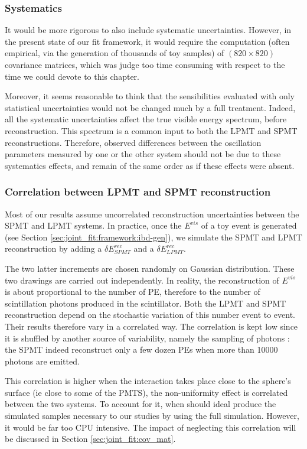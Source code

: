\documentclass[../main.tex]{subfiles}
\begin{document}
\subsubsection{Systematics}
It would be more rigorous to also include systematic uncertainties. However, in the present state of our fit framework, it would require the computation (often empirical, via the generation of thousands of toy samples) of $(820 \times 820)$ covariance matrices, which was judge too time consuming with respect to the time we could devote to this chapter.

Moreover, it seems reasonable to think that the sensibilities evaluated with only statistical uncertainties would not be changed much by a full treatment. Indeed, all the systematic uncertainties affect the true visible energy spectrum, before reconstruction. This spectrum is a common input to both the LPMT and SPMT reconstructions. Therefore, observed differences between the oscillation parameters measured by one or the other system should not be due to these systematics effects, and remain of the same order as if these effects were absent.

\subsubsection{Correlation between LPMT and SPMT reconstruction}

Most of our results assume uncorrelated reconstruction uncertainties between the SPMT and LPMT systems. In practice, once the $E^{vis}$ of a toy event is generated (see Section \ref{sec:joint_fit:framework:ibd-gen}), we simulate the SPMT and LPMT reconstruction by adding a $\delta E^{rec}_{SPMT}$ and a $\delta E^{rec}_{LPMT}$.

The two latter increments are chosen randomly on Gaussian distribution. These two drawings are carried out independently. In reality, the reconstruction of $E^{vis}$ is about proportional to the number of PE, therefore to the number of scintillation photons produced in the scintillator. Both the LPMT and SPMT reconstruction depend on the stochastic variation of this number event to event. Their results therefore vary in a correlated way. The correlation is kept low since it is shuffled by another source of variability, namely the sampling of photons : the SPMT indeed reconstruct only a few dozen PEs when more than 10000 photons are emitted.

This correlation is higher when the interaction takes place close to the sphere's surface (ie close to some of the PMTS), the non-uniformity effect is correlated between the two systems. To account for it, when should ideal produce the simulated samples necessary to our studies by using the full simulation. However, it would be far too CPU intensive. The impact of neglecting this correlation will be discussed in Section \ref{sec:joint_fit:cov_mat}.
\end{document}
